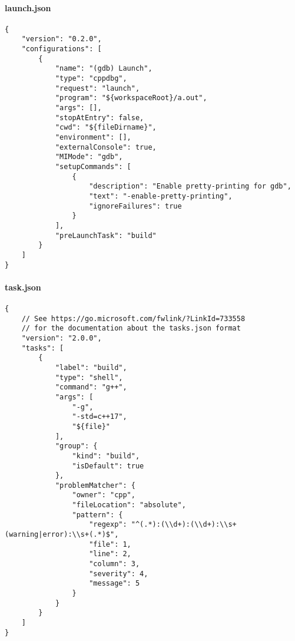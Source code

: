 \paragraph{launch.json}
\begin{lstlisting}
{
    "version": "0.2.0",
    "configurations": [
        {
            "name": "(gdb) Launch",
            "type": "cppdbg",
            "request": "launch",
            "program": "${workspaceRoot}/a.out",
            "args": [],
            "stopAtEntry": false,
            "cwd": "${fileDirname}",
            "environment": [],
            "externalConsole": true,
            "MIMode": "gdb",
            "setupCommands": [
                {
                    "description": "Enable pretty-printing for gdb",
                    "text": "-enable-pretty-printing",
                    "ignoreFailures": true
                }
            ],
            "preLaunchTask": "build"
        }
    ]
}
\end{lstlisting}

\paragraph{task.json}
\begin{lstlisting}
{
    // See https://go.microsoft.com/fwlink/?LinkId=733558
    // for the documentation about the tasks.json format
    "version": "2.0.0",
    "tasks": [
        {
            "label": "build",
            "type": "shell",
            "command": "g++",
            "args": [
                "-g",
                "-std=c++17",
                "${file}"
            ],
            "group": {
                "kind": "build",
                "isDefault": true
            },
            "problemMatcher": {
                "owner": "cpp",
                "fileLocation": "absolute",
                "pattern": {
                    "regexp": "^(.*):(\\d+):(\\d+):\\s+(warning|error):\\s+(.*)$",
                    "file": 1,
                    "line": 2,
                    "column": 3,
                    "severity": 4,
                    "message": 5
                }
            }
        }
    ]
}
\end{lstlisting}
